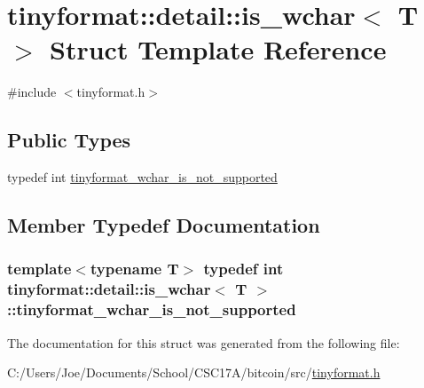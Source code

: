 \hypertarget{structtinyformat_1_1detail_1_1is__wchar}{}\section{tinyformat\+:\+:detail\+:\+:is\+\_\+wchar$<$ T $>$ Struct Template Reference}
\label{structtinyformat_1_1detail_1_1is__wchar}


{\ttfamily \#include $<$tinyformat.\+h$>$}

\subsection*{Public Types}
\begin{DoxyCompactItemize}
\item 
typedef int \hyperlink{structtinyformat_1_1detail_1_1is__wchar_a2006c700bf3264d6002993949bbaaac9}{tinyformat\+\_\+wchar\+\_\+is\+\_\+not\+\_\+supported}
\end{DoxyCompactItemize}


\subsection{Member Typedef Documentation}
\hypertarget{structtinyformat_1_1detail_1_1is__wchar_a2006c700bf3264d6002993949bbaaac9}{}
\subsubsection[{tinyformat\+\_\+wchar\+\_\+is\+\_\+not\+\_\+supported}]{\setlength{\rightskip}{0pt plus 5cm}template$<$typename T$>$ typedef int {\bf tinyformat\+::detail\+::is\+\_\+wchar}$<$ T $>$\+::{\bf tinyformat\+\_\+wchar\+\_\+is\+\_\+not\+\_\+supported}}\label{structtinyformat_1_1detail_1_1is__wchar_a2006c700bf3264d6002993949bbaaac9}


The documentation for this struct was generated from the following file\+:\begin{DoxyCompactItemize}
\item 
C\+:/\+Users/\+Joe/\+Documents/\+School/\+C\+S\+C17\+A/bitcoin/src/\hyperlink{tinyformat_8h}{tinyformat.\+h}\end{DoxyCompactItemize}
